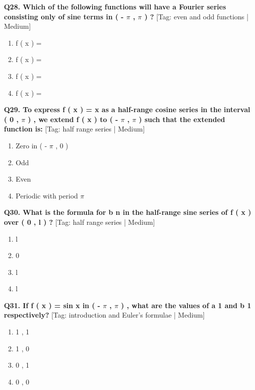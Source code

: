 \noindent\textbf{Q28. Which of the following functions will have a Fourier series consisting only of sine terms in ( - $\pi$ , $\pi$ ) ?} \hfill [Tag: even and odd functions | Medium]
\begin{enumerate}[label=(\alph*),topsep=2pt,itemsep=1pt,partopsep=0pt,parsep=0pt]
    \item {{f ( x ) =}}
    \item {{f ( x ) =}}
    \item {{f ( x ) =}}
    \item {{f ( x ) =}}
\end{enumerate}
\vspace{2mm}

\noindent\textbf{Q29. To express f ( x ) = x as a half-range cosine series in the interval ( 0 , $\pi$ ) , we extend f ( x ) to ( - $\pi$ , $\pi$ ) such that the extended function is:} \hfill [Tag: half range series | Medium]
\begin{enumerate}[label=(\alph*),topsep=2pt,itemsep=1pt,partopsep=0pt,parsep=0pt]
    \item {{Zero in ( - $\pi$ , 0 )}}
    \item {{Odd}}
    \item {{Even}}
    \item {{Periodic with period $\pi$}}
\end{enumerate}
\vspace{2mm}

\noindent\textbf{Q30. What is the formula for b n in the half-range sine series of f ( x ) over ( 0 , l ) ?} \hfill [Tag: half range series | Medium]
\begin{enumerate}[label=(\alph*),topsep=2pt,itemsep=1pt,partopsep=0pt,parsep=0pt]
    \item {{l}}
    \item {{0}}
    \item {{l}}
    \item {{l}}
\end{enumerate}
\vspace{2mm}

\noindent\textbf{Q31. If f ( x ) = sin x in ( - $\pi$ , $\pi$ ) , what are the values of a 1 and b 1 respectively?} \hfill [Tag: introduction and Euler's formulae | Medium]
\begin{enumerate}[label=(\alph*),topsep=2pt,itemsep=1pt,partopsep=0pt,parsep=0pt]
    \item {{1 , 1}}
    \item {{1 , 0}}
    \item {{0 , 1}}
    \item {{0 , 0}}
\end{enumerate}
\vspace{2mm}

